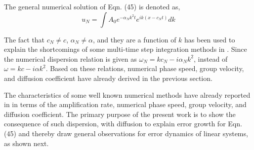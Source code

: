 \documentclass[showpacs,preprintnumbers,amsmath,amssymb]{revtex4-1} %
\begin{document}
The general numerical solution of Eqn. (45) is denoted as,
\begin{equation}
u_N=\int A_0e^{-\alpha_Nk^2t}e^{ik(x-c_Nt)}dk
\end{equation}

The fact that $c_N \neq c$, $\alpha_N\neq \alpha$, and they are a function of $k$ has been used to explain the shortcomings of some multi-time step integration methods in \cite{sengupta2004}. Since the numerical dispersion relation is given as $\omega_N=kc_N-i\alpha_Nk^2$, instead of $\omega=kc-i\alpha k^2$. Based on these relations, numerical phase speed, group velocity, and diffusion coefficient have already derived in the previous section.

The characteristics of some well known numerical methods have already reported in \cite{SENGUPTA_et_al_2, SENGUPTA_et_al_3, SENGUPTA_et_al_7} in terms of the amplification rate, numerical phase speed, group velocity, and diffusion coefficient. The primary purpose of the present work is to show the consequence of such dispersion, with diffusion to explain error growth for Eqn. (45) and thereby draw general observations for error dynamics of linear systems, as shown next.
\end{document}
